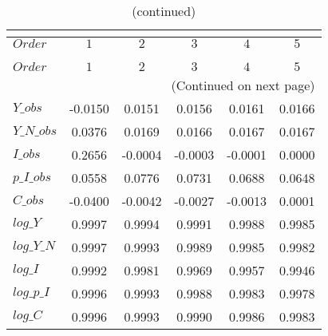  
\begin{center}
\begin{longtable}{lccccc} 
\caption{COEFFICIENTS OF AUTOCORRELATION}\\
 \label{Table:th_autocorr_matrix}\\
\toprule 
$Order      $	 & 	 $         1$	 & 	 $         2$	 & 	 $         3$	 & 	 $         4$	 & 	 $         5$\\
\midrule \endfirsthead 
\caption{(continued)}\\
 \toprule \\ 
$Order      $	 & 	 $         1$	 & 	 $         2$	 & 	 $         3$	 & 	 $         4$	 & 	 $         5$\\
\midrule \endhead 
\midrule \multicolumn{6}{r}{(Continued on next page)} \\ \bottomrule \endfoot 
\bottomrule \endlastfoot 
$Y\_obs     $	 & 	   -0.0150	 & 	    0.0151	 & 	    0.0156	 & 	    0.0161	 & 	    0.0166 \\ 
$Y\_N\_obs  $	 & 	    0.0376	 & 	    0.0169	 & 	    0.0166	 & 	    0.0167	 & 	    0.0167 \\ 
$I\_obs     $	 & 	    0.2656	 & 	   -0.0004	 & 	   -0.0003	 & 	   -0.0001	 & 	    0.0000 \\ 
$p\_I\_obs  $	 & 	    0.0558	 & 	    0.0776	 & 	    0.0731	 & 	    0.0688	 & 	    0.0648 \\ 
$C\_obs     $	 & 	   -0.0400	 & 	   -0.0042	 & 	   -0.0027	 & 	   -0.0013	 & 	    0.0001 \\ 
$log\_Y     $	 & 	    0.9997	 & 	    0.9994	 & 	    0.9991	 & 	    0.9988	 & 	    0.9985 \\ 
$log\_Y\_N  $	 & 	    0.9997	 & 	    0.9993	 & 	    0.9989	 & 	    0.9985	 & 	    0.9982 \\ 
$log\_I     $	 & 	    0.9992	 & 	    0.9981	 & 	    0.9969	 & 	    0.9957	 & 	    0.9946 \\ 
$log\_p\_I  $	 & 	    0.9996	 & 	    0.9993	 & 	    0.9988	 & 	    0.9983	 & 	    0.9978 \\ 
$log\_C     $	 & 	    0.9996	 & 	    0.9993	 & 	    0.9990	 & 	    0.9986	 & 	    0.9983 \\ 
\end{longtable}
 \end{center}
